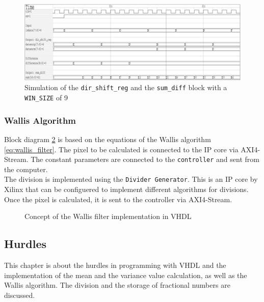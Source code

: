 \begin{figure}[tb!]
    \centering
    \includegraphics[width=\textwidth]
    {images/image_processing/dir_shift_sum_diff.png}
    \caption{Simulation of the \texttt{dir\_shift\_reg} and the
    \texttt{sum\_diff} block with a \texttt{WIN\_SIZE} of 9}
    \label{fig:sim_shift_sum}
\end{figure}

\subsubsection*{Wallis Algorithm}
Block diagram \ref{fig:wallis_vhdl} is based on the equations of the Wallis algorithm \ref{eq:wallis_filter}.
The pixel to be calculated is connected to the IP core via AXI4-Stream. The constant parameters are connected to the \texttt{controller} and sent from the computer. \\
The division is implemented using the \texttt{Divider Generator}. This is an IP
core
by Xilinx that can be configuered to implement different algorithms for
divisions. Once the pixel is calculated, it is sent to the controller via AXI4-Stream.

\clearpage

\begin{figure}[tb!]
    \centering
    \begin{adjustbox}{max width=0.95\textwidth}
        
    \end{adjustbox}
    \caption{Concept of the Wallis filter implementation in VHDL}
    \label{fig:wallis_vhdl}
\end{figure}

\subsection{Hurdles} \label{ch:ip:hurdles_vhdl}
This chapter is about the hurdles in programming with VHDL and the
implementation of the mean and the variance value calculation, as well as the
Wallis algorithm.
The division and the storage of fractional numbers are discussed.

